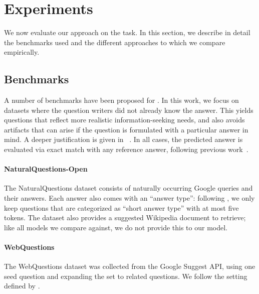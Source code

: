 \section{Experiments} %
\label{sec:experiments}

We now evaluate our approach on the \openqa task.
In this section, we describe in detail the benchmarks used and the different approaches to which we compare empirically.

\subsection{\openqa Benchmarks}
A number of benchmarks have been proposed for \openqa. In this work, we focus on datasets where the question writers did not already know the answer. This yields questions that reflect more realistic information-seeking needs, and also avoids artifacts that can arise if the question is formulated with a particular answer in mind. A deeper justification is given in ~\citet{orqa}.
In all cases, the predicted answer is evaluated via exact match with any reference answer, following previous \openqa work~\cite{drqa}.

\paragraph{NaturalQuestions-Open} The NaturalQuestions dataset \cite{naturalquestions} consists of naturally occurring Google queries and their answers. Each answer also comes with an ``answer type'': following \citet{orqa}, we only keep questions that are categorized as ``short answer type'' with at most five tokens. The dataset also provides a suggested Wikipedia document to retrieve; like all models we compare against, we do not provide this to our model.


\paragraph{WebQuestions} The WebQuestions dataset \cite{webquestions} was collected from the Google Suggest API, using one seed question and expanding the set to related questions. We follow the setting defined by \citet{drqa}.

